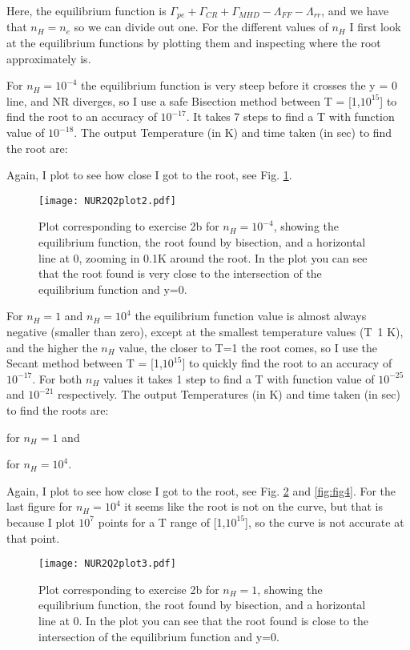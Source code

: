 Here, the equilibrium function is $\Gamma_{pe} + \Gamma_{CR} + \Gamma_{MHD} - \Lambda_{FF} - \Lambda_{rr}$, and we have that $n_H = n_e$ so we can divide out one. 
For the different values of $n_H$ I first look at the equilibrium functions by plotting them and inspecting where the root approximately is. 

For $n_H = 10^{-4}$ the equilibrium function is very steep before it crosses the y = 0 line, and NR diverges, so I use a safe Bisection method between T = [1,$10^{15}$] to find the root to an accuracy of $10^{-17}$. It takes 7 steps to find a T with function value of $10^{-18}$.
The output Temperature (in K) and time taken (in sec) to find the root are:


Again, I plot to see how close I got to the root, see Fig. \ref{fig:fig2}.

\begin{figure}[h!]
  \centering
  \texttt{[image: NUR2Q2plot2.pdf]}
  \caption{Plot corresponding to exercise 2b for $n_H = 10^{-4}$, showing the equilibrium function, the root found by bisection, and a horizontal line at 0, zooming in 0.1K around the root. In the plot you can see that the root found is very close to the intersection of the equilibrium function and y=0.}
  \label{fig:fig2}
\end{figure} 


For $n_H = 1$ and $n_H = 10^4$ the equilibrium function value is almost always negative (smaller than zero), except at the smallest temperature values (T~1 K), and the higher the $n_H$ value, the closer to T=1 the root comes, so I use the Secant method between T = [1,$10^{15}$] to quickly find the root to an accuracy of $10^{-17}$. 
For both $n_H$ values it takes 1 step to find a T with function value of $10^{-25}$ and $10^{-21}$ respectively.
The output Temperatures (in K) and time taken (in sec) to find the roots are:

for $n_H = 1$ and 

for $n_H = 10^4$.

Again, I plot to see how close I got to the root, see Fig. \ref{fig:fig3} and \ref{fig:fig4}. For the last figure for $n_H = 10^4$ it seems like the root is not on the curve, but that is because I plot $10^7$ points for a T range of [1,$10^{15}$], so the curve is not accurate at that point.


\begin{figure}[h!]
  \centering
  \texttt{[image: NUR2Q2plot3.pdf]}
  \caption{Plot corresponding to exercise 2b for $n_H = 1$, showing the equilibrium function, the root found by bisection, and a horizontal line at 0. In the plot you can see that the root found is close to the intersection of the equilibrium function and y=0.}
  \label{fig:fig3}
\end{figure} 

